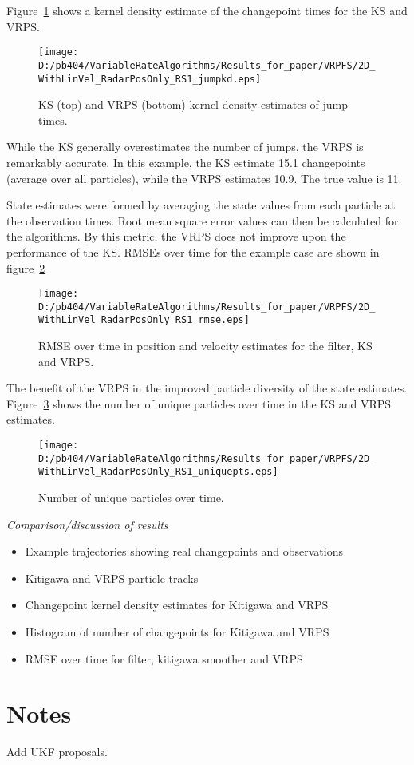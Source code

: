 \documentclass[a4paper,10pt]{article}
\newenvironment{meta}[0]{\color{red} \em}{}
\begin{document}
Figure~\ref{fig:2D_jumpkd} shows a kernel density estimate of the changepoint times for the KS and VRPS.

\begin{figure}[hbt]
\centering \texttt{[image: D:/pb404/VariableRateAlgorithms/Results\_for\_paper/VRPFS/2D\_WithLinVel\_RadarPosOnly\_RS1\_jumpkd.eps]}
\caption{KS (top) and VRPS (bottom) kernel density estimates of jump times.}
\label{fig:2D_jumpkd}
\end{figure}

While the KS generally overestimates the number of jumps, the VRPS is remarkably accurate. In this example, the KS estimate 15.1 changepoints (average over all particles), while the VRPS estimates 10.9. The true value is 11.

State estimates were formed by averaging the state values from each particle at the observation times. Root mean square error values can then be calculated for the algorithms. By this metric, the VRPS does not improve upon the performance of the KS. RMSEs over time for the example case are shown in figure~\ref{fig:2D_rmse}

\begin{figure}[hbt]
\centering \texttt{[image: D:/pb404/VariableRateAlgorithms/Results\_for\_paper/VRPFS/2D\_WithLinVel\_RadarPosOnly\_RS1\_rmse.eps]}
\caption{RMSE over time in position and velocity estimates for the filter, KS and VRPS.}
\label{fig:2D_rmse}
\end{figure}

The benefit of the VRPS in the improved particle diversity of the state estimates. Figure~\ref{fig:2D_uniquepts} shows the number of unique particles over time in the KS and VRPS estimates.

\begin{figure}[hbt]
\centering \texttt{[image: D:/pb404/VariableRateAlgorithms/Results\_for\_paper/VRPFS/2D\_WithLinVel\_RadarPosOnly\_RS1\_uniquepts.eps]}
\caption{Number of unique particles over time.}
\label{fig:2D_uniquepts}
\end{figure}



\begin{meta}
Comparison/discussion of results
\begin{itemize}
	\item Example trajectories showing real changepoints and observations
	\item Kitigawa and VRPS particle tracks
	\item Changepoint kernel density estimates for Kitigawa and VRPS
	\item Histogram of number of changepoints for Kitigawa and VRPS
	\item RMSE over time for filter, kitigawa smoother and VRPS
\end{itemize}
\end{meta}




\section{Notes}
Add UKF proposals.


%

\end{document}
